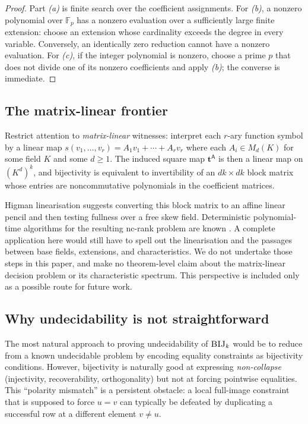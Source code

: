 \documentclass[11pt]{article}
\newcommand{\parencite}[1]{\citep{#1}}
\theoremstyle{definition}
\theoremstyle{plain}
\newcommand{\A}{\mathsf{A}}
\begin{document}
\begin{proof}
Part \textit{(a)} is finite search over the coefficient assignments.  For \textit{(b)}, a nonzero polynomial
over $\mathbb F_p$ has a nonzero evaluation over a sufficiently large finite extension: choose an extension
whose cardinality exceeds the degree in every variable.  Conversely, an identically zero reduction cannot
have a nonzero evaluation.  For \textit{(c)}, if the integer polynomial is nonzero, choose a prime $p$ that
does not divide one of its nonzero coefficients and apply \textit{(b)}; the converse is immediate.
\end{proof}

\subsection{The matrix-linear frontier}
\label{subsec:matrix-linear}
Restrict attention to \emph{matrix-linear} witnesses: interpret each $r$-ary function symbol by a linear map
$s(v_1,\dots,v_r)=A_1v_1+\cdots+A_rv_r$ where each $A_i\in M_d(K)$ for some field $K$ and some $d\ge 1$.
The induced square map $\mathbf t^\A$ is then a linear map on $(K^d)^k$, and bijectivity is equivalent to
invertibility of an $dk\times dk$ block matrix whose entries are noncommutative polynomials in the coefficient
matrices.

Higman linearisation suggests converting this block matrix to an affine linear pencil and then testing fullness
over a free skew field.  Deterministic polynomial-time algorithms for the resulting nc-rank problem are known
\parencite{garg2016deterministic,ivanyos2018constructive}.  A complete application here would still have to
spell out the linearisation and the passages between base fields, extensions, and characteristics.  We do not
undertake those steps in this paper, and make no theorem-level claim about the matrix-linear decision problem or
its characteristic spectrum.  This perspective is included only as a possible route for future work.

\subsection{Why undecidability is not straightforward}
\label{subsec:why-hard}
The most natural approach to proving undecidability of $\textsc{BIJ}_k$ would be to reduce from a known
undecidable problem by encoding equality constraints as bijectivity conditions.  However, bijectivity is naturally
good at expressing \emph{non-collapse} (injectivity, recoverability, orthogonality) but not at forcing pointwise
equalities.  This ``polarity mismatch'' is a persistent obstacle: a local full-image constraint that is supposed
to force $u=v$ can typically be defeated by duplicating a successful row at a different element $v\neq u$.
\end{document}
